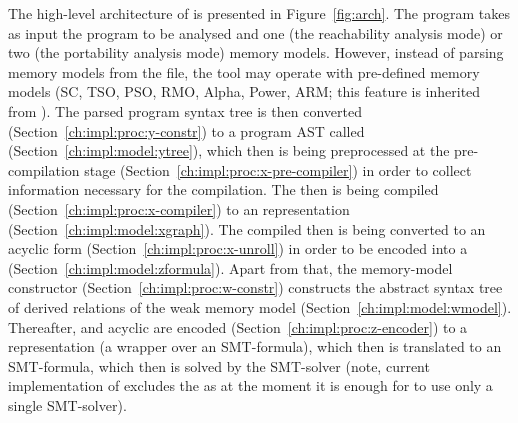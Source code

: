 The high-level architecture of \porthos[2] is presented in Figure~\ref{fig:arch}.
The program takes as input the program to be analysed and one (the reachability analysis mode) or two (the portability analysis mode) memory models.
However, instead of parsing memory models from the \cat{} file, the tool may operate with pre-defined memory models (SC, TSO, PSO, RMO, Alpha, Power, ARM; this feature is inherited from \porthos[1]).
The parsed program syntax tree is then converted (Section~\ref{ch:impl:proc:y-constr}) to a program AST called \ytree{}%
%
%
%
(Section~\ref{ch:impl:model:ytree}), which then is being preprocessed at the pre-compilation stage (Section~\ref{ch:impl:proc:x-pre-compiler}) in order to collect information necessary for the compilation.
The \ytree{} then is being compiled (Section~\ref{ch:impl:proc:x-compiler}) to an \xgraph{} representation (Section~\ref{ch:impl:model:xgraph}).
The compiled \xgraph{} then is being converted to an acyclic form (Section~\ref{ch:impl:proc:x-unroll}) in order to be encoded into a \zformula{} (Section~\ref{ch:impl:model:zformula}).
Apart from that, the memory-model constructor (Section~\ref{ch:impl:proc:w-constr}) constructs the abstract syntax tree of derived relations of the weak memory model \wmodel{} (Section~\ref{ch:impl:model:wmodel}).
Thereafter, \wmodel{} and acyclic \xgraph{} are encoded (Section~\ref{ch:impl:proc:z-encoder}) to a \zformula{} representation (a wrapper over an SMT-formula), which then is translated to an SMT-formula, which then is solved by the SMT-solver (note, current implementation of \porthos[2] excludes the \zformula{} as at the moment it is enough for \porthos[2] to use only a single SMT-solver).



